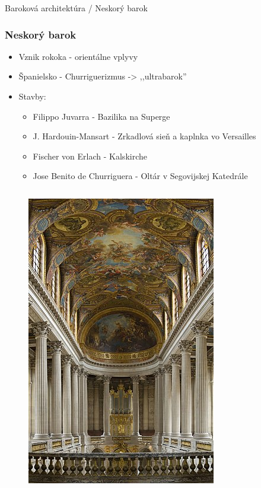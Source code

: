 \documentclass[dvipsnames]{beamer}
\begin{document}
\begin{frame}{\small \textcolor{g}{Baroková architektúra} / \Large Neskorý barok}
	\subsubsection{Neskorý barok}
	\begin{itemize}
		\item Vznik rokoka - orientálne vplyvy
		\item Španielsko - Churriguerizmus -> ,,ultrabarok''
		\item Stavby:
		      \begin{itemize}
			      \item \textcolor{BurntOrange}{Filippo Juvarra} - Bazilika na Superge
			      \item \textcolor{BurntOrange}{J. Hardouin-Mansart} - Zrkadlová sieň a kaplnka vo Versailles
			      \item \textcolor{BurntOrange}{Fischer von Erlach} - Kalskirche
			      \item \textcolor{BurntOrange}{Jose Benito de Churriguera} - Oltár v Segovijskej Katedrále
		      \end{itemize}
	\end{itemize}
	\vskip -4mm
	\begin{columns}
		\kern0pt
		\begin{figure}
			\includegraphics[scale=0.25]{verzajl}

\end{figure}
\end{columns}
\end{frame}
\end{document}
